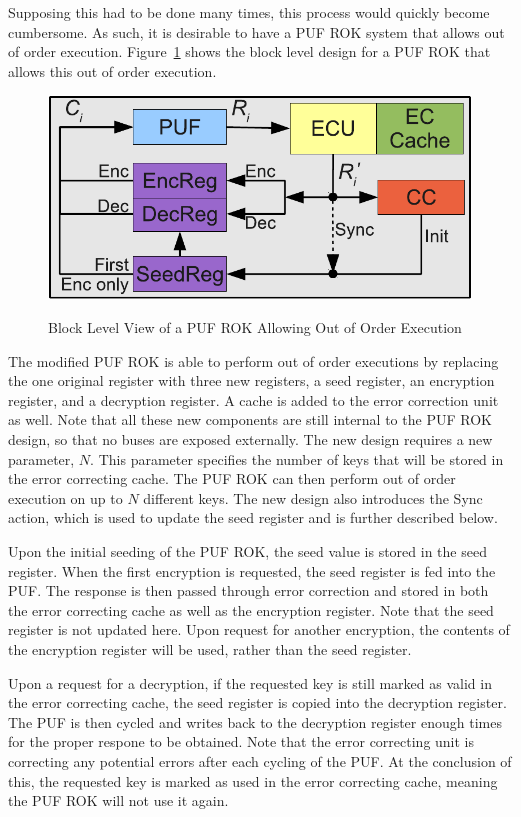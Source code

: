 Supposing this had to be done many times, this process would quickly become cumbersome. As such, it is desirable to
have a PUF ROK system that allows out of order execution. Figure~\ref{fig:rok} shows the block level design for a PUF
ROK that allows this out of order execution.

\begin{figure}[!ht]
\includegraphics[width=500px]{images/rok_socreg.pdf}
\label{fig:rok}
\caption{Block Level View of a PUF ROK Allowing Out of Order Execution}
\end{figure}
\FloatBarrier

The modified PUF ROK is able to perform out of order executions by replacing the one original register with three
new registers, a seed register, an encryption register, and a decryption register. A cache is added to the error
correction unit as well. Note that all these new components are still internal to the PUF ROK design, so that no
buses are exposed externally.
The new design requires a new parameter, $N$. This parameter specifies the number of keys that will be stored in
the error correcting cache. The PUF ROK can then perform out of order execution on up to $N$ different keys.
The new design also introduces the Sync action, which is used to update the seed register and is further described
below.

Upon the initial seeding of the PUF ROK, the seed value is stored in the seed register. When the first encryption
is requested, the seed register is fed into the PUF. The response is then passed through error correction and stored
in both the error correcting cache as well as the encryption register. Note that the seed register is not updated here.
Upon request for another encryption, the contents of the encryption register will be used, rather than the seed register.

Upon a request for a decryption, if the requested key is still marked as valid in the error correcting cache,
the seed register is copied into the decryption register. The PUF is then cycled
and writes back to the decryption register enough times for the proper respone to be obtained. Note that the
error correcting unit is correcting any potential errors after each cycling of the PUF. At the conclusion of this, the
requested key is marked as used in the error correcting cache, meaning the PUF ROK will not use it again.

